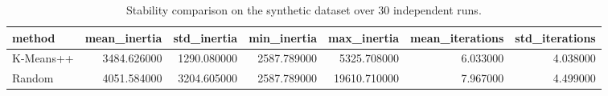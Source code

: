 \begin{table}
\caption{Stability comparison on the synthetic dataset over 30 independent runs.}
\label{tab:synthetic_stability}
\begin{tabular}{lrrrrrr}
\toprule
method & mean_inertia & std_inertia & min_inertia & max_inertia & mean_iterations & std_iterations \\
\midrule
K-Means++ & 3484.626000 & 1290.080000 & 2587.789000 & 5325.708000 & 6.033000 & 4.038000 \\
Random & 4051.584000 & 3204.605000 & 2587.789000 & 19610.710000 & 7.967000 & 4.499000 \\
\bottomrule
\end{tabular}
\end{table}
